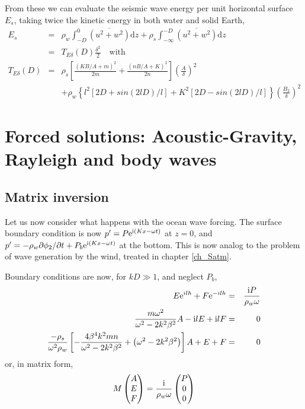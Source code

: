 From these we can evaluate the seismic wave energy per unit horizontal surface  $E_s$, taking twice the kinetic 
energy in both water and solid Earth, 
\begin{eqnarray}
E_s &=& \rho_w \int_{-D}^{0} \overline{\left(u^2+w^2\right)}  {\mathrm d}z + \rho_s \int_{-\infty}^{-D} \overline{\left(u^2+w^2\right)} {\mathrm d}z \\
 &=&  T_{E \delta}(D) \frac{\delta^2}{2} \quad \mathrm{with} \\
T_{E \delta}(D) &=& \rho_s \left[\frac{(K B/A +m)^2}{2 m} +\frac{(n B/A+K)^2}{2 n}\right]\left(\frac{A}{\delta}\right)^2 \nonumber \\
                & & + \rho_w   \left\{ l^2 \left[2D+sin(2 lD)/l\right] +  K^2 \left[2D-sin(2 l D)/l\right]\right\}\left(\frac{B_2}{\delta}\right)^2
\label{Kedelta}
 \end{eqnarray}

\section{Forced solutions:  Acoustic-Gravity, Rayleigh and body waves}
\subsection{Matrix inversion}
Let us now consider what happens with the ocean wave forcing. 
The surface boundary condition is now  $p'=P \mathrm{e}^{\mathrm{i}(K x - \omega t)}$ at $z=0$, and $p'=-\rho_w \partial \phi_2/\partial t + P_b \mathrm{e}^{\mathrm{i}(K x - \omega t)}$ at the bottom. This is now analog to the problem 
of wave generation by the wind, treated in chapter  \ref{ch_Satm}. 

Boundary conditions are now, for $kD \gg 1$, and neglect $P_b$, 
\begin{eqnarray}
  E \mathrm{e}^{ilh} + F \mathrm{e}^{-ilh} &= & \frac{\mathrm{i} P}{\rho_w \omega} \\
\frac{m \omega^2}{\omega^2-2k^2 \beta^2}  A   - \mathrm{i} l E + \mathrm{i} l F &= &0 \\
 \frac{-\rho_s}{\omega^2 \rho_w} \left[- \frac{4 \beta^4 k^2 m n}{\omega^2- 2k^2 \beta^2}
 + \left(\omega^2- 2k^2 \beta^2 \right)\right] A + E + F &=& 0 
\end{eqnarray}
or, in matrix form, 
\begin{equation}
M \begin{pmatrix}
A\\
E\\
F\\
\end{pmatrix} =\frac{\mathrm{i}}{\rho_w \omega} \begin{pmatrix}
P\\
0\\
0\\
\end{pmatrix} 
\end{equation}

